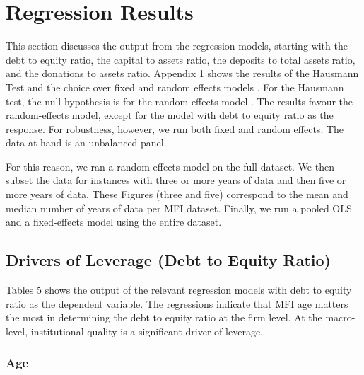 \documentclass[a4paper, nobind]{templates/ociamthesis}
\begin{document}
\hypertarget{regression-results}{%
\section{Regression Results}\label{regression-results}}

This section discusses the output from the regression models, starting with the debt to equity ratio, the capital to assets ratio, the deposits to total assets ratio, and the donations to assets ratio. Appendix 1 shows the results of the Hausmann Test and the choice over fixed and random effects models \autocite{clark2015should}. For the Hausmann test, the null hypothesis is for the random-effects model \autocite{torres2007panel}. The results favour the random-effects model, except for the model with debt to equity ratio as the response. For robustness, however, we run both fixed and random effects. The data at hand is an unbalanced panel.

For this reason, we ran a random-effects model on the full dataset. We then subset the data for instances with three or more years of data and then five or more years of data. These Figures (three and five) correspond to the mean and median number of years of data per MFI dataset. Finally, we run a pooled OLS and a fixed-effects model using the entire dataset.

\hypertarget{drivers-of-leverage-debt-to-equity-ratio}{%
\subsection{Drivers of Leverage (Debt to Equity Ratio)}\label{drivers-of-leverage-debt-to-equity-ratio}}

Tables 5 shows the output of the relevant regression models with debt to equity ratio as the dependent variable. The regressions indicate that MFI age matters the most in determining the debt to equity ratio at the firm level. At the macro-level, institutional quality is a significant driver of leverage.

\hypertarget{age-1}{%
\subsubsection{Age}\label{age-1}}
\end{document}
